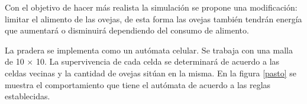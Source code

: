 \documentclass[12pt, twocolumn]{article}
\begin{document}
Con el objetivo de hacer m\'as realista la simulaci\'on se propone una modificaci\'on: limitar el alimento de las ovejas, de esta forma las ovejas tambi\'en tendr\'an energ\'ia que aumentar\'a o disminuir\'a dependiendo del consumo de alimento. 

La pradera se implementa como un aut\'omata celular. Se trabaja con una malla de 10 $\times$ 10. La supervivencia de cada celda se determinar\'a de acuerdo a las celdas vecinas y la cantidad de ovejas sit\'uan en la misma. En la figura \ref{pasto} se muestra el comportamiento que tiene el aut\'omata de acuerdo a las reglas establecidas.

\begin{figure}[htbp]
\centering
{}

\end{figure}
\end{document}
